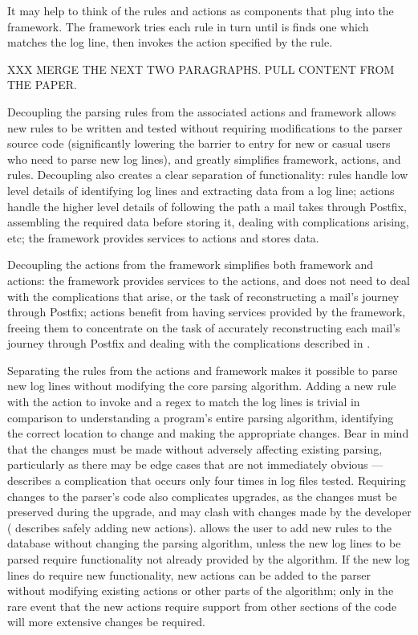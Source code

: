 It may help to think of the rules and actions as components that plug into
the framework.  The framework tries each rule in turn until is finds one
which matches the log line, then invokes the action specified by the rule.

\label{why separate rules, actions, and framework?}

XXX MERGE THE NEXT TWO PARAGRAPHS\@.  PULL CONTENT FROM THE PAPER\@.

Decoupling the parsing rules from the associated actions and framework
allows new rules to be written and tested without requiring modifications
to the parser source code (significantly lowering the barrier to entry for
new or casual users who need to parse new log lines), and greatly
simplifies framework, actions, and rules.  Decoupling also creates a clear
separation of functionality: rules handle low level details of identifying
log lines and extracting data from a log line; actions handle the higher
level details of following the path a mail takes through Postfix,
assembling the required data before storing it, dealing with complications
arising, etc; the framework provides services to actions and stores data.

Decoupling the actions from the framework simplifies both framework and
actions: the framework provides services to the actions, and does not need
to deal with the complications that arise, or the task of reconstructing a
mail's journey through Postfix; actions benefit from having services
provided by the framework, freeing them to concentrate on the task of
accurately reconstructing each mail's journey through Postfix and dealing
with the complications described in .

Separating the rules from the actions and framework makes it possible to
parse new log lines without modifying the core parsing algorithm.  Adding a
new rule with the action to invoke and a regex to match the log lines is
trivial in comparison to understanding a program's entire parsing
algorithm, identifying the correct location to change and making the
appropriate changes.  Bear in mind that the changes must be made without
adversely affecting existing parsing, particularly as there may be edge
cases that are not immediately obvious ---
 describes a complication
that occurs only four times in \numberOFlogFILES{} log files tested.
Requiring changes to the parser's code also complicates upgrades, as the
changes must be preserved during the upgrade, and may clash with changes
made by the developer ( describes safely
adding new actions).  \parsername{} allows the user to add new rules to the
database without changing the parsing algorithm, unless the new log lines
to be parsed require functionality not already provided by the algorithm.
If the new log lines do require new functionality, new actions can be added
to the parser without modifying existing actions or other parts of the
algorithm; only in the rare event that the new actions require support from
other sections of the code will more extensive changes be required.

